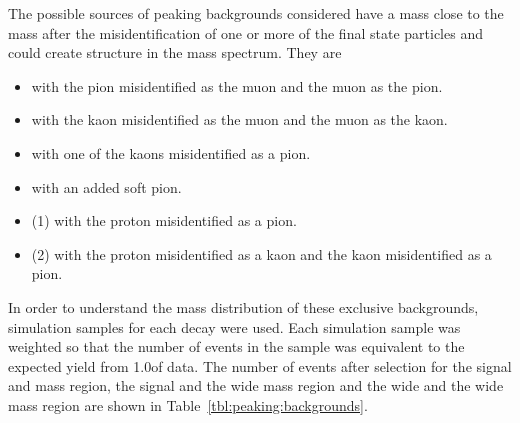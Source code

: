The possible sources of peaking backgrounds considered have a %
mass close to the \Bd mass after the misidentification of one or more of the final state particles
 and could create structure in the \kpi mass spectrum. They are
\begin{itemize}
\item \BdToKstmm with the pion misidentified as the muon and the muon as the pion.
\item \BdToKstmm with the kaon misidentified as the muon and the muon as the kaon.
\item \BsToPhimm with one of the kaons misidentified as a pion.
\item \BuToKmm with an added soft pion.
\item \LbToLmm (1) with the proton misidentified as a pion.
\item \LbToLmm (2) with the proton misidentified as a kaon and the kaon misidentified as a pion.
\end{itemize}
In order to understand the \kpi mass distribution of these exclusive backgrounds, 
simulation samples for each decay were used. %
Each simulation sample was weighted so that the number of events in the sample was equivalent to the expected yield from 1.0\invfb of data.
The number of events after selection for the signal \Bd and \kpi mass region, the signal \Bd and the wide \kpi mass region
 and the wide \Bd and the wide \kpi mass region are shown in Table~\ref{tbl:peaking:backgrounds}.
